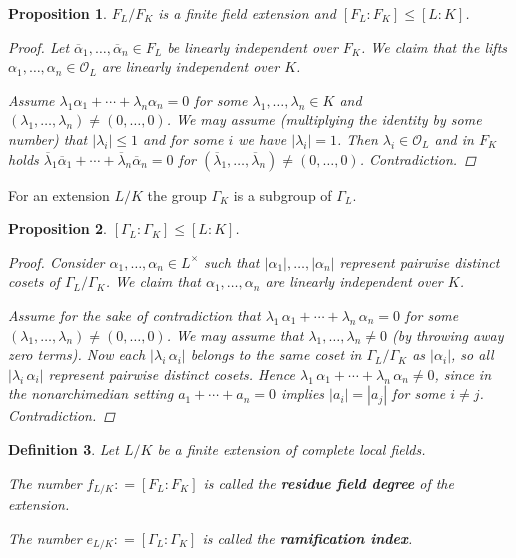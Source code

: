 \documentclass{article}
\newcommand{\term}{\textbf}
\newcommand{\dfn}{\mathrel{\mathop:}=}
\renewcommand{\O}{\mathcal{O}}
\theoremstyle{myplain}
\newtheorem{proposition}{Proposition}[section]
\theoremstyle{mydefinition}
\newtheorem{definition}[proposition]{Definition}
\begin{document}
\begin{proposition}
  $F_L/F_K$ is a finite field extension and $[F_L : F_K] \le [L : K]$.

  \begin{proof}
    Let $\overline{\alpha}_1, \ldots, \overline{\alpha}_n \in F_L$ be linearly
    independent over $F_K$. We claim that the lifts
    $\alpha_1, \ldots, \alpha_n \in \O_L$ are linearly independent over $K$.

    Assume $\lambda_1 \alpha_1 + \cdots + \lambda_n \alpha_n = 0$ for some
    $\lambda_1,\ldots,\lambda_n \in K$ and
    $(\lambda_1,\ldots,\lambda_n) \ne (0, \ldots, 0)$. We may assume
    (multiplying the identity by some number) that $|\lambda_i| \le 1$ and for
    some $i$ we have $|\lambda_i| = 1$. Then $\lambda_i \in \O_L$ and in $F_K$
    holds
    $\overline{\lambda}_1 \overline{\alpha}_1 + \cdots + \overline{\lambda}_n \overline{\alpha}_n = 0$
    for $(\overline{\lambda}_1, \ldots, \overline{\lambda}_n) \ne (0,\ldots,0)$.
    Contradiction.
  \end{proof}
\end{proposition}

For an extension $L/K$ the group $\Gamma_K$ is a subgroup of $\Gamma_L$.

\begin{proposition}
  $[\Gamma_L : \Gamma_K] \le [L:K]$.

  \begin{proof}
    Consider $\alpha_1, \ldots, \alpha_n \in L^\times$ such that
    $|\alpha_1|, \ldots, |\alpha_n|$ represent pairwise distinct cosets of
    $\Gamma_L / \Gamma_K$. We claim that $\alpha_1, \ldots, \alpha_n$ are
    linearly independent over $K$.

    Assume for the sake of contradiction that
    $\lambda_1\,\alpha_1 + \cdots + \lambda_n\,\alpha_n = 0$ for some
    $(\lambda_1,\ldots,\lambda_n) \ne (0,\ldots,0)$. We may assume that
    $\lambda_1, \ldots, \lambda_n \ne 0$ (by throwing away zero terms). Now each
    $|\lambda_i\,\alpha_i|$ belongs to the same coset in $\Gamma_L / \Gamma_K$
    as $|\alpha_i|$, so all $|\lambda_i\,\alpha_i|$ represent pairwise distinct
    cosets. Hence $\lambda_1\,\alpha_1 + \cdots + \lambda_n\,\alpha_n \ne 0$,
    since in the nonarchimedian setting $a_1 + \cdots + a_n = 0$ implies
    $|a_i| = |a_j|$ for some $i \ne j$. Contradiction.
  \end{proof}
\end{proposition}

\begin{definition}
  Let $L / K$ be a finite extension of complete local fields.

  The number $f_{L/K} \dfn [F_L : F_K]$ is called the \term{residue field
    degree} of the extension.

  The number $e_{L/K} \dfn [\Gamma_L : \Gamma_K]$ is called the
  \term{ramification index}.
\end{definition}
\end{document}
